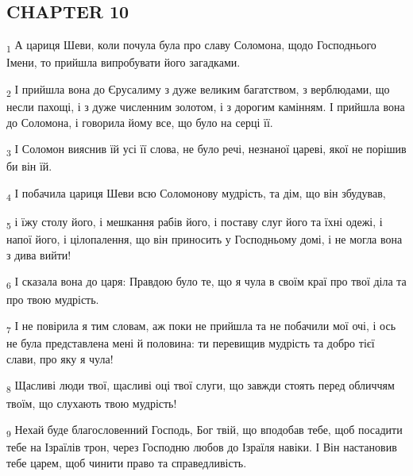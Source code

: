 \subsection{CHAPTER 10}
\begin{tcolorbox}
\textsubscript{1} А цариця Шеви, коли почула була про славу Соломона, щодо Господнього Імени, то прийшла випробувати його загадками.
\end{tcolorbox}
\begin{tcolorbox}
\textsubscript{2} І прийшла вона до Єрусалиму з дуже великим багатством, з верблюдами, що несли пахощі, і з дуже численним золотом, і з дорогим камінням. І прийшла вона до Соломона, і говорила йому все, що було на серці її.
\end{tcolorbox}
\begin{tcolorbox}
\textsubscript{3} І Соломон вияснив їй усі її слова, не було речі, незнаної цареві, якої не порішив би він їй.
\end{tcolorbox}
\begin{tcolorbox}
\textsubscript{4} І побачила цариця Шеви всю Соломонову мудрість, та дім, що він збудував,
\end{tcolorbox}
\begin{tcolorbox}
\textsubscript{5} і їжу столу його, і мешкання рабів його, і поставу слуг його та їхні одежі, і напої його, і цілопалення, що він приносить у Господньому домі, і не могла вона з дива вийти!
\end{tcolorbox}
\begin{tcolorbox}
\textsubscript{6} І сказала вона до царя: Правдою було те, що я чула в своїм краї про твої діла та про твою мудрість.
\end{tcolorbox}
\begin{tcolorbox}
\textsubscript{7} І не повірила я тим словам, аж поки не прийшла та не побачили мої очі, і ось не була представлена мені й половина: ти перевищив мудрість та добро тієї слави, про яку я чула!
\end{tcolorbox}
\begin{tcolorbox}
\textsubscript{8} Щасливі люди твої, щасливі оці твої слуги, що завжди стоять перед обличчям твоїм, що слухають твою мудрість!
\end{tcolorbox}
\begin{tcolorbox}
\textsubscript{9} Нехай буде благословенний Господь, Бог твій, що вподобав тебе, щоб посадити тебе на Ізраїлів трон, через Господню любов до Ізраїля навіки. І Він настановив тебе царем, щоб чинити право та справедливість.
\end{tcolorbox}
